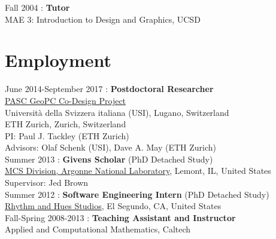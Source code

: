 \documentclass[12pt]{article}
\begin{document}
\noindent Fall 2004 : \textbf{Tutor}\\
 MAE 3: Introduction to Design and Graphics, UCSD\\

\section*{Employment}


\noindent June 2014-September 2017 : \textbf{Postdoctoral Researcher} \\
\href{http://www.pasc-ch.org/projects/projects/geopc/}{PASC GeoPC Co-Design Project} \\
Universit\`{a} della Svizzera italiana (USI), Lugano, Switzerland \\
ETH Zurich, Zurich, Switzerland \\
PI: Paul J. Tackley (ETH Zurich) \\
Advisors: Olaf Schenk (USI), Dave A. May (ETH Zurich) \\


\noindent Summer 2013 : \textbf{Givens Scholar} (PhD Detached Study) \\
\href{http://www.mcs.anl.gov}{MCS Division, Argonne National Laboratory}, Lemont, IL, United States \\
Supervisor: Jed Brown \\


\noindent Summer 2012 : \textbf{Software Engineering Intern} (PhD Detached Study)\\
\href{http://www.rhythm.com}{Rhythm and Hues Studios},
El Segundo, CA, United States \\


\noindent Fall-Spring 2008-2013 : \textbf{Teaching Assistant and Instructor}\\
Applied and Computational Mathematics, Caltech\\
\end{document}
